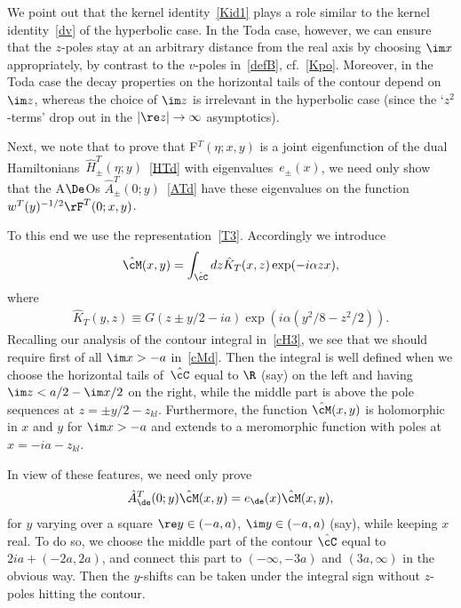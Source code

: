 \documentclass[pdftex]{sigma}
\numberwithin{equation}{section}
\begin{document}
We point out that the kernel identity~\eqref{Kid1} plays a role similar to the kernel identity~\eqref{dv} of the hyperbolic case. In the Toda case, however, we can ensure that the $z$-poles stay at an arbitrary distance from the real axis by choosing $\im x$ appropriately, by contrast to the $v$-poles in~\eqref{defB}, cf.~\eqref{Kpo}. Moreover, in the Toda case the decay properties on the horizontal tails of the contour depend on $\im z$, whereas the choice of $\im z$ is irrelevant in the hyperbolic case (since the `$z^2$-terms' drop out in the $|\re z|\to\infty$ asymptotics).

Next, we note that to prove that F$^T(\eta;x,y)$ is a joint eigenfunction of the dual Hamilto\-nians~$\hat{H}^T_{\pm}(\eta;y)$~\eqref{HTd} with eigenvalues~$e_{\pm}(x)$, we need only show that the A$\De$Os $\hat{A}^T_{\pm}(0;y)$~\eqref{ATd} have these eigenvalues on the function~$w^T(y)^{-1/2}\rF^T (0;x,y)$.

To this end we use the representation~\eqref{T3}. Accordingly we introduce
\begin{gather}\label{cMd}
\hat{\cM}(x,y)=\int_{\hat{\cC}}dz\hat{K}_T(x,z)\exp(-i\alpha zx),
\end{gather}
where
\begin{gather}\label{KTd}
\hat{K}_T(y,z)\equiv G( z\pm y/2-ia)\exp(i\alpha(y^2/8-z^2/2)).
\end{gather}
Recalling our analysis of the contour integral in~\eqref{cH3}, we see that we should require f\/irst of all $\im x>-a$ in~\eqref{cMd}. Then the integral is well def\/ined when we choose the horizontal tails of~$\hat{\cC}$ equal to $\R$ (say) on the left and having $\im z<a/2-\im x/2$ on the right, while the middle part is above the pole sequences at $z=\pm y/2-z_{kl}$. Furthermore, the function $\hat{\cM}(x,y)$ is holomorphic in $x$ and $y$ for $\im x>-a$ and extends to a meromorphic function with poles at $x=-ia-z_{kl}$.

In view of these features, we need only prove
\begin{gather}\label{ATM}
\hat{A}^T_{\de}(0;y)\hat{\cM}(x,y)=e_{\de}(x)\hat{\cM}(x,y),
\end{gather}
for $y$ varying over a square $\re y \in (-a,a)$, $\im y \in (-a,a)$ (say), while keeping $x$ real. To do so, we choose the middle part of the contour $\hat{\cC}$ equal to $2ia+(-2a,2a)$,  and connect this part to $(-\infty,-3a)$ and $(3a,\infty)$ in the obvious way. Then the $y$-shifts can be taken under the integral sign without $z$-poles hitting the contour.
\end{document}

